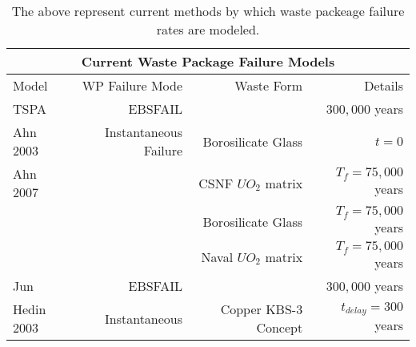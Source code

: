 \begin{table}
\centering
\footnotesize{
\begin{tabular}[h!bt]{|l|r|r|r|}
  \multicolumn{4}{c}{\textbf{Current Waste Package Failure Models}}\\
  \hline
  Model&WP Failure Mode&Waste Form&Details\\
  \hline
  TSPA&EBSFAIL&&$300,000$ years\\
  \hline
  Ahn 2003&Instantaneous Failure&Borosilicate Glass&$t=0$\\
  \hline
  Ahn 2007& &CSNF $UO_2$ matrix &$T_f=75,000$ years\\
  & &Borosilicate Glass &$T_f=75,000$ years\\
  & & Naval $UO_2$ matrix &$T_f=75,000$ years\\
  \hline
  Jun&EBSFAIL&&$300,000$ years\\
  \hline
  Hedin 2003& Instantaneous & Copper KBS-3 Concept & $t_{delay} = 300$ years \\
  \hline
\end{tabular}
\label{tab:wpfail}
\caption[Current WP Failure Models]{The above represent current methods by which waste packeage 
failure rates are modeled.}
}
\end{table}

